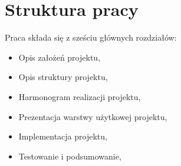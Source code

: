 \section{Struktura pracy}
Praca składa się z sześciu głównych rozdziałów:
\begin{itemize}
\item Opis założeń projektu,
\item Opis struktury projektu,
\item Harmonogram realizacji projektu,
\item Prezentacja warstwy użytkowej projektu,
\item Implementacja projektu,
\item Testowanie i podsumowanie,
\end{itemize}

